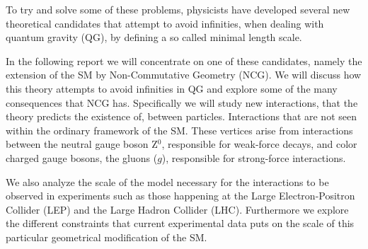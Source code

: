 To try and solve some of these problems, physicists have developed several new theoretical candidates that attempt to avoid infinities, when dealing with quantum gravity (QG), by defining a so called minimal length scale.

In the following report we will concentrate on one of these candidates, namely the extension of the SM by Non-Commutative Geometry (NCG). We will discuss how this theory attempts to avoid infinities in QG and explore some of the many consequences that NCG has. Specifically we will study new interactions, that the theory predicts the existence of, between particles. Interactions that are not seen within the ordinary framework of the SM. These vertices arise from interactions between the neutral gauge boson Z$^0$, responsible for weak-force decays, and color charged gauge bosons, the gluons ($g$), responsible for strong-force interactions.

We also analyze the scale of the model necessary for the interactions to be observed in experiments such as those happening at the Large Electron-Positron Collider (LEP) and the Large Hadron Collider (LHC). Furthermore we explore the different constraints that current experimental data puts on the scale of this particular geometrical modification of the SM.
